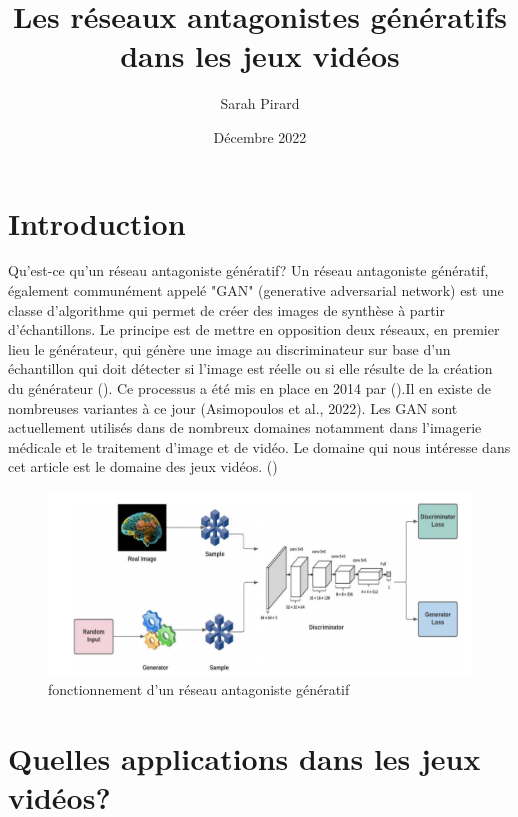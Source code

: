\documentclass[a4paper,11pt]{article} %
\title{Les réseaux antagonistes génératifs dans les jeux vidéos}
\author{Sarah Pirard}
\date{Décembre 2022}
\begin{document}
\maketitle

\section{Introduction}
Qu'est-ce qu'un réseau antagoniste génératif? Un réseau antagoniste génératif, également communément appelé "GAN" (generative adversarial network) est une classe d'algorithme qui permet de créer des images de synthèse à partir d'échantillons. Le principe est de mettre en opposition deux réseaux, en premier lieu le générateur, qui génère une image au discriminateur sur base d'un échantillon qui doit détecter si l'image est réelle ou si elle résulte de la création du générateur (\citeauthor{aggarwal_generative_2021}). Ce processus a été mis en place en 2014 par (\citeauthor{goodfellow_generative_2014}).Il en existe de nombreuses variantes à ce jour (Asimopoulos et al., 2022). Les GAN sont actuellement utilisés dans de nombreux domaines notamment dans l'imagerie médicale et le traitement d'image et de vidéo. Le domaine qui nous intéresse dans cet article est le domaine des jeux vidéos. (\citeauthor{noauthor_generative_2022})

\begin{figure}[h] %
  \centering %
  \includegraphics[scale=0.17]{GAN}
  \caption{fonctionnement d'un réseau antagoniste génératif} %
\end{figure}

\section{Quelles applications dans les jeux vidéos?}
\end{document}
